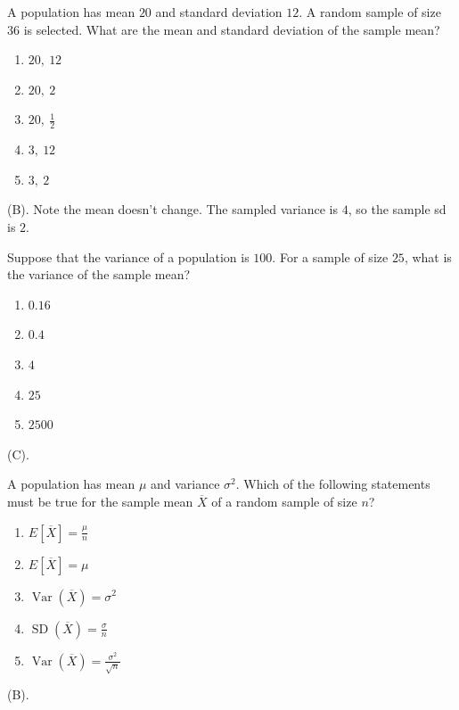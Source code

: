 \begin{exercise}
A population has mean $20$ and standard deviation $12$. A random sample
of size $36$ is selected. What are the mean and standard deviation of the
sample mean?

\begin{enumerate}[label=(\Alph*)]
    \item $20,\ 12$
    \item $20,\ 2$
    \item $20,\ \frac{1}{2}$
    \item $3,\ 12$
    \item $3,\ 2$
\end{enumerate}
\end{exercise}
\begin{solution}
(B). Note the mean doesn't change. The sampled variance is $4$, so the sample sd is $2$.
\end{solution}

\begin{exercise}
Suppose that the variance of a population is $100$. For a sample of size
$25$, what is the variance of the sample mean?
\begin{enumerate}[label=(\Alph*)]
    \item $0.16$
    \item $0.4$
    \item $4$
    \item $25$
    \item $2500$
\end{enumerate}
\end{exercise}
\begin{solution}
(C).
\end{solution}

\begin{exercise}
A population has mean $\mu$ and variance $\sigma^2$. Which of the
following statements must be true for the sample mean $\overline{X}$
of a random sample of size $n$?
\begin{enumerate}[label=(\Alph*)]
    \item $E[\overline{X}]=\frac{\mu}{n}$
    \item $E[\overline{X}]=\mu$
    \item $\operatorname{Var}(\overline{X})=\sigma^2$
    \item $\operatorname{SD}(\overline{X})=\frac{\sigma}{n}$
    \item $\operatorname{Var}(\overline{X})=\frac{\sigma^2}{\sqrt{n}}$
\end{enumerate}
\end{exercise}
\begin{solution}
(B).
\end{solution}

